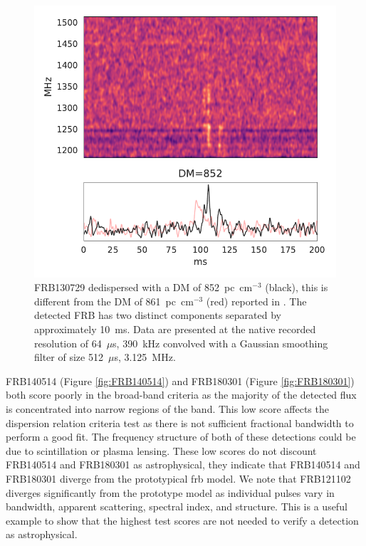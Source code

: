 \documentclass[a4paper,fleqn,usenatbib]{mnras}
\begin{document}
\begin{figure}
    \includegraphics[width=1.0\linewidth]{figures/FRB130729.pdf}
    \caption{FRB130729 dedispersed with a DM of 852~pc~cm$^{-3}$ (black), this
    is different from the DM of 861~pc~cm$^{-3}$ (red) reported in
    \protect\cite{2016MNRAS.460L..30C}.  The detected FRB has two distinct
    components separated by approximately 10~ms. Data are presented at the native
    recorded resolution of 64~$\mu$s, 390~kHz convolved with a Gaussian
    smoothing filter of size 512~$\mu$s, 3.125~MHz.}
    \label{fig:FRB130729}
\end{figure}

FRB140514 (Figure \ref{fig:FRB140514}) and FRB180301 (Figure
\ref{fig:FRB180301}) both score poorly in the broad-band criteria as the
majority of the detected flux is concentrated into narrow regions of the band.
This low score affects the dispersion relation criteria test as there is not
sufficient fractional bandwidth to perform a good fit. The frequency structure
of both of these detections could be due to scintillation or plasma lensing.
These low scores do not discount FRB140514 and FRB180301 as astrophysical, they
indicate that FRB140514 and FRB180301 diverge from the prototypical \gls{frb}
model.  We note that FRB121102 diverges significantly from the prototype model
as individual pulses vary in bandwidth, apparent scattering, spectral index, and
structure.  This is a useful example to show that the highest test scores are
not needed to verify a detection as astrophysical.
\end{document}
